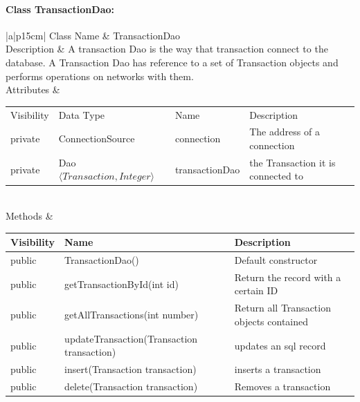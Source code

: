 \documentclass[12pt]{article}
\begin{document}
\paragraph{Class TransactionDao:}
\begin{table}[H]	
	\begin{tabular}{|a|p{15cm}|}
		\hline
		{Class Name} & {TransactionDao} \\
		\hline
		Description & A transaction Dao is the way that transaction connect to the database. A Transaction Dao has reference to a set of Transaction objects and performs operations on networks with them.\\
		\hline
		Attributes & 
		\begin{tabular}{| p{1.8cm} | p{5.25cm} | p{3.4cm} | p{3.0cm} |}
			\hline
			\rowcolor{lightgray}
			Visibility & Data Type & Name & Description \\
			\rowcolor{white}
			private & ConnectionSource & connection & The address of a connection \\
			\hline
			private & Dao $\langle Transaction, Integer \rangle$ & transactionDao & the Transaction it is connected to \\
			\hline
		\end{tabular} \\
		\hline
		Methods & 		 
		\begin{tabular}{| p{2cm} | p{7cm} | p{4.9cm} |}
			\hline
			\rowcolor{gray}
			{Visibility} &{Name} & {Description} \\
			\hline
			\rowcolor{white}			
			public &  TransactionDao() & Default constructor\\
			\hline
			public &  getTransactionById(int id) & Return the record with a certain ID\\
			\hline
			public &  getAllTransactions(int number) & Return all Transaction objects contained\\
			\hline
			public &  updateTransaction(Transaction transaction) & updates an sql record\\
			\hline
			public &  insert(Transaction transaction) &  inserts a transaction\\
			\hline
			public &  delete(Transaction transaction) & Removes a transaction\\
			\hline
			
		\end{tabular}								 
	\end{tabular}
\end{table}
\end{document}
